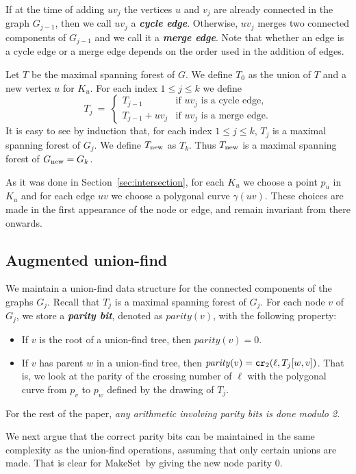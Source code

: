\documentclass[a4paper,11pt]{article}
\newcommand{\Gnew}{G_{\rm new}}
\newcommand{\Tnew}{T_{\rm new}}
\def\makeset{\mbox{\sc MakeSet}}
\def\parity{\mathit{parity}}
\newcommand\CR{\mbox{\tt cr}_2}
\def\DEF#1{\textbf{\emph{#1}}}
\begin{document}
If at the time of adding $uv_j$ the vertices $u$ and $v_j$ are already connected 
in the graph $G_{j-1}$, then we call $uv_j$ a \DEF{cycle edge}.
Otherwise, $uv_j$ merges two connected components of $G_{j-1}$
and we call it a \DEF{merge edge}.
Note that whether an edge is a cycle edge or a merge edge depends on the order used in the addition of edges.

Let $T$ be the maximal spanning forest of $G$.
We define $T_0$ as the union of $T$ and a new vertex $u$ for $K_u$. 
For each index $1\le j\le k$ we define
\[
	T_j~=~ \begin{cases}
			T_{j-1} &\text{if $uv_j$ is a cycle edge,}\\
			T_{j-1}+uv_j & \text{if $uv_j$ is a merge edge.}
		\end{cases}
\]
It is easy to see by induction that, for each index $1\le j\le k$,
$T_j$ is a maximal spanning forest of $G_j$.
We define $\Tnew$ as $T_k$. Thus $\Tnew$ is a maximal spanning
forest of $\Gnew=G_k$.

As it was done in Section~\ref{sec:intersection},
for each $K_u$ we choose a point $p_u$ in $K_u$ and for
each edge $uv$ we choose a polygonal curve $\gamma(uv)$.
These choices are made in the first appearance of the node or edge,
and remain invariant from there onwards.
 

\subsection{Augmented union-find}
\label{sec:extended}

We maintain a union-find data structure for the connected components 
of the graphs $G_j$.
Recall that $T_j$ is a maximal spanning forest of $G_j$.
For each node $v$ of $G_j$, we store a \DEF{parity bit}, denoted as $\parity(v)$, 
with the following property:
\begin{itemize}
	\item If $v$ is the root of a union-find tree, then $\parity(v)=0$.
	\item If $v$ has parent $w$ in a union-find tree, 
		then $\parity(v)= \CR(\ell, T_j[w,v])$. That is,
		we look at the parity of the crossing number of $\ell$ with
		the polygonal curve from $p_v$ to $p_w$ defined by the drawing of $T_j$.
\end{itemize}
For the rest of the paper, \emph{any arithmetic involving parity bits is done modulo 2.}

We next argue that the correct parity bits can be maintained in the same complexity as the union-find operations, assuming that only certain unions are made.
That is clear for \makeset\ by giving the new node parity $0$. 
\end{document}
